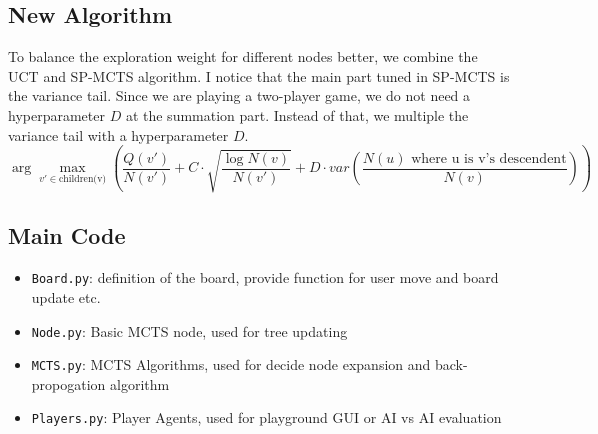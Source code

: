 \documentclass[11pt]{article}
\theoremstyle{definitionstyle}
\begin{document}
\subsection{New Algorithm}
To balance the exploration weight for different nodes better, we combine the UCT and SP-MCTS algorithm. I notice that the main part tuned in SP-MCTS is the variance tail. Since we are playing a two-player game, we do not need a hyperparameter $D$ at the summation part. Instead of that, we multiple the variance tail with a hyperparameter $D$.
\[
    \arg\max_{v'\in\text{children(v)}}\left(\frac{Q(v')}{N(v')}+C\cdot\sqrt{\frac{\log N(v)}{N(v')}}+D\cdot var(\frac{N(u)\text{ where u is v's descendent}}{N(v)})\right)
\]
\subsection{Main Code}
\begin{itemize}
    \item \texttt{Board.py}: definition of the board, provide function for user move and board update etc.
    \item \texttt{Node.py}: Basic MCTS node, used for tree updating
    \item \texttt{MCTS.py}: MCTS Algorithms, used for decide node expansion and back-propogation algorithm
    \item \texttt{Players.py}: Player Agents, used for playground GUI or AI vs AI evaluation 
\end{itemize}
\end{document}
